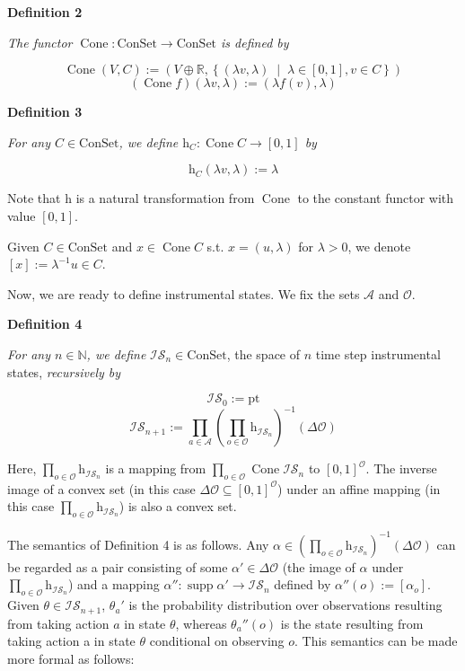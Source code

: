 \documentclass[a4paper]{article}
\newcommand{\Co}[1]{}
\DeclareMathOperator{\Supp}{supp}
\newcommand{\AP}[1]{\left(#1\right)}
\newcommand{\AB}[1]{\left[#1\right]}
\newcommand{\ACM}[2]{\left\{#1\;\middle\vert\;#2\right\}}
\newcommand{\Nats}{\mathbb{N}}
\newcommand{\Reals}{\mathbb{R}}
\newcommand{\Pt}{\boldsymbol{\mathrm{pt}}}
\newcommand{\A}{\mathcal{A}}
\newcommand{\Ob}{\mathcal{O}}
\newcommand{\Con}{{\boldsymbol{\mathrm{ConSet}}}}
\DeclareMathOperator{\Cone}{Cone}
\newcommand{\Ht}{\mathrm{h}}
\newcommand{\IS}{\mathcal{IS}}
\begin{document}
\textbf{Definition 2}\Co{b}

\textit{The functor $\Cone:\Con\rightarrow\Con$ is defined by}\Co{i}

$$\Cone{(V,C)}:=\AP{V\oplus\Reals,\ACM{(\lambda v,\lambda)}{\lambda\in[0,1], v\in C}}$$
$$\AP{\Cone{f}}(\lambda v, \lambda):=\AP{\lambda f(v), \lambda}$$

\textbf{Definition 3}\Co{b}

\textit{For any $C\in\Con$, we define $\Ht_{C}:\Cone{C}\rightarrow[0,1]$ by}\Co{i}

$$\Ht_{C}(\lambda v, \lambda):=\lambda$$

Note that $\Ht$ is a natural transformation from $\Cone$ to the constant functor with value $[0,1]$.

Given $C\in\Con$ and $x\in \Cone C$ s.t. $x=(u,\lambda)$ for $\lambda > 0$, we denote $[x]:=\lambda^{-1}u\in C$.

Now, we are ready to define instrumental states. We fix the sets $\A$ and $\Ob$.

\textbf{Definition 4}\Co{b}

\textit{For any $n\in\Nats$, we define} $\IS_n\in\Con$, the space of $n$ time step instrumental states, \textit{recursively by}

$$\IS_0:=\Pt$$
$$\IS_{n+1}:=\prod_{a\in\A}\AP{\prod_{o\in\Ob}\Ht_{\IS_n}}^{-1}(\Delta\Ob)$$

Here, $\prod_{o\in\Ob}\Ht_{\IS_n}$ is a mapping from $\prod_{o\in\Ob}\Cone\IS_n$ to $[0,1]^\Ob$. The inverse image of a convex set (in this case $\Delta\Ob\subseteq[0,1]^\Ob$) under an affine mapping (in this case $\prod_{o\in\Ob}\Ht_{\IS_n}$) is also a convex set.

The semantics of Definition 4 is as follows. Any $\alpha\in\AP{\prod_{o\in\Ob}\Ht_{\IS_n}}^{-1}(\Delta\Ob)$ can be regarded as a pair consisting of some $\alpha'\in\Delta\Ob$ (the image of $\alpha$ under $\prod_{o\in\Ob}\Ht_{\IS_n}$) and a mapping $\alpha'':\Supp{\alpha'}\rightarrow\IS_n$ defined by $\alpha''(o):=\AB{\alpha_o}$. Given $\theta\in\IS_{n+1}$, $\theta_{a}'$ is the probability distribution over observations resulting from taking action $a$ in state $\theta$, whereas $\theta_{a}''(o)$ is the state resulting from taking action a in state $\theta$ conditional on observing $o$. This semantics can be made more formal as follows:

\Co{In the following, we will use the notation $\theta\mid a$ instead of $\theta_a$ and $\theta\mid ao$ instead of $\theta_{a1}(o)$.}
\end{document}
